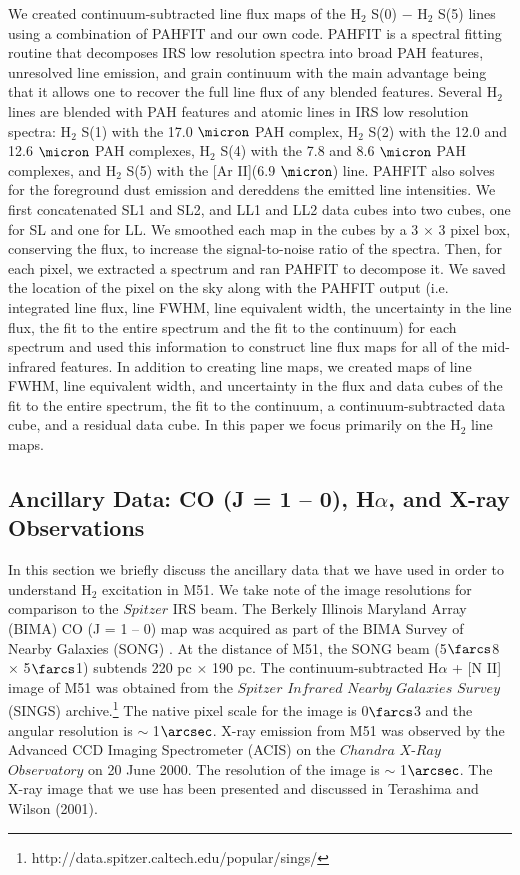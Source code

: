 \documentclass[manuscript]{aastex}
\begin{document}
We created continuum-subtracted line flux maps of the H$_2$
S(0) $-$ H$_2$ S(5) lines using a combination of PAHFIT
\citep{smi07} and our own code.  PAHFIT is a spectral fitting routine
that decomposes IRS low resolution spectra into broad 
PAH features, unresolved line emission, and grain continuum with the main advantage
being that it allows one to recover the full line flux of any blended
features.  Several H$_2$ lines are blended with PAH features and atomic 
lines in IRS low resolution spectra:
H$_2$ S(1) with the 17.0 $\micron$ PAH complex,
H$_2$ S(2) with the 12.0 and 12.6 $\micron$ PAH complexes, 
H$_2$ S(4) with the 7.8 and 8.6 $\micron$ PAH complexes, and 
H$_2$ S(5) with the [Ar II](6.9 $\micron$) line.  
PAHFIT also solves for the foreground dust emission and 
dereddens the emitted line intensities.  We first
concatenated SL1 and SL2, and LL1 and LL2 data cubes into two cubes,
one for SL and one for LL.  We smoothed each map in the cubes by a 3
$\times$ 3 pixel box, conserving the flux, to increase the
signal-to-noise ratio of the spectra.  Then, for each pixel, we
extracted a spectrum and ran PAHFIT to decompose it.  We saved the
location of the pixel on the sky along with the PAHFIT output 
(i.e. integrated line flux, line FWHM, line equivalent width, the 
uncertainty in the line flux, the fit to the entire spectrum and 
the fit to the continuum) for each spectrum and used this 
information to construct line flux maps for all of the mid-infrared 
features.  In addition to creating line maps, we created maps 
of line FWHM, line equivalent width, and uncertainty in the 
flux and data cubes of the fit to the entire spectrum, the fit to 
the continuum, a continuum-subtracted data cube, and a 
residual data cube.  In this paper we focus primarily on the 
H$_2$ line maps.

\subsection{Ancillary Data: CO (J = 1 -- 0), H$\alpha$, and X-ray Observations}

In this section we briefly discuss the ancillary data that we 
have used in order to understand H$_2$ excitation in M51.  
We take note of the image resolutions for comparison to the
$Spitzer$ IRS beam.  The Berkely Illinois Maryland Array (BIMA) CO (J = 1 -- 0) map was
acquired as part of the BIMA Survey of Nearby Galaxies (SONG)
\citep{reg01, hel03}.  At the distance of M51, the SONG beam
(5$\farcs$8 $\times$ 5$\farcs$1) subtends 220 pc $\times$ 190 pc.  
The continuum-subtracted H$\alpha$ + [N II] image of M51 was obtained from the
$Spitzer$ $Infrared$ $Nearby$ $Galaxies$ $Survey$ (SINGS) archive.\footnote{http://data.spitzer.caltech.edu/popular/sings/} 
The native pixel scale for the image is 0$\farcs$3 
and the angular resolution is $\sim$ 1$\arcsec$.  X-ray 
emission from M51 was observed by the Advanced CCD 
Imaging Spectrometer (ACIS) on the $Chandra$ $X$-$Ray$ 
$Observatory$ on 20 June 2000.  The resolution of 
the image is $\sim$ 1$\arcsec$.  The X-ray image that 
we use has been presented and discussed in 
Terashima and Wilson (2001).
\end{document}

